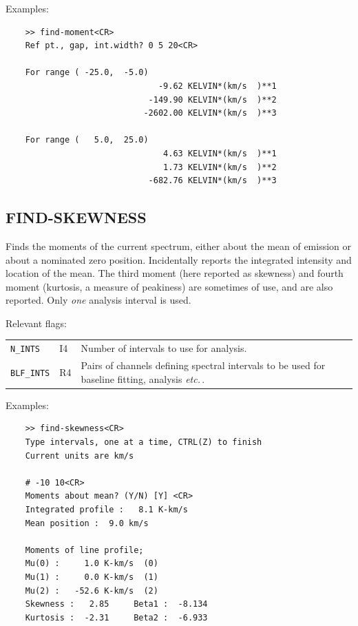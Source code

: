 \documentclass[11pt,twoside]{report}
\newcommand{\etc}{{\it etc.\,}}
\begin{document}
Examples:
\begin{verbatim}
    >> find-moment<CR>
    Ref pt., gap, int.width? 0 5 20<CR>

    For range ( -25.0,  -5.0)
                               -9.62 KELVIN*(km/s  )**1
                             -149.90 KELVIN*(km/s  )**2
                            -2602.00 KELVIN*(km/s  )**3

    For range (   5.0,  25.0)
                                4.63 KELVIN*(km/s  )**1
                                1.73 KELVIN*(km/s  )**2
                             -682.76 KELVIN*(km/s  )**3
\end{verbatim}

\subsection{FIND-SKEWNESS} 

Finds the moments of the current spectrum, either about the mean
of emission or about a nominated zero position. Incidentally reports
the integrated intensity and location of the mean. The third moment
(here reported as skewness) and fourth moment (kurtosis, a measure of
peakiness) are sometimes of use, and are also reported. Only {\em one}
analysis interval is used.

Relevant flags:\\
\begin{tabular}{lll}
  \verb+N_INTS+    & I4 & Number of intervals to use for analysis.\\
  \verb+BLF_INTS+  & R4 & \parbox[t]{4in}
                          {Pairs of channels defining spectral intervals to 
                           be used for baseline fitting, analysis \etc.}
\end{tabular}

Examples:
\begin{verbatim}
    >> find-skewness<CR>
    Type intervals, one at a time, CTRL(Z) to finish
    Current units are km/s  

    # -10 10<CR>
    Moments about mean? (Y/N) [Y] <CR>
    Integrated profile :   8.1 K-km/s  
    Mean position :  9.0 km/s  

    Moments of line profile;
    Mu(0) :     1.0 K-km/s  (0)
    Mu(1) :     0.0 K-km/s  (1)
    Mu(2) :   -52.6 K-km/s  (2)
    Skewness :   2.85     Beta1 :  -8.134
    Kurtosis :  -2.31     Beta2 :  -6.933
\end{verbatim}
\end{document}
